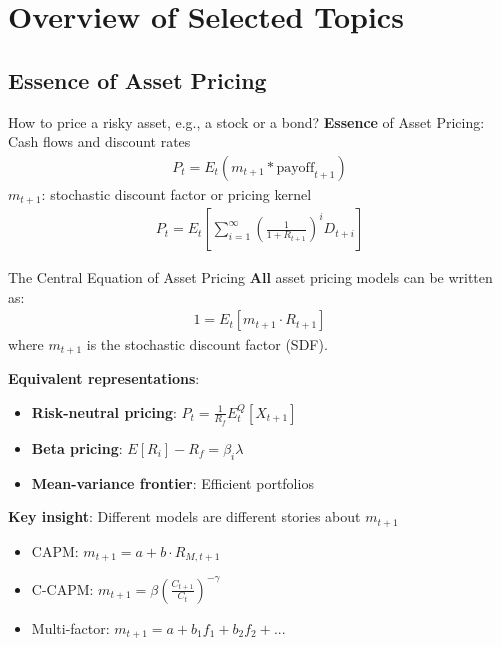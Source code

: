 \documentclass{beamer}
\begin{document}
\section{Overview of Selected Topics}

\subsection{Essence of Asset Pricing}

\begin{frame}{How to price a risky asset, e.g., a stock or a bond?}
	\textbf{Essence} of Asset Pricing: Cash flows and discount rates
	\begin{align*}
		P_{t}=E_{t}\left(m_{t+1} *  \mathrm{payoff}_{t+1}\right)
	\end{align*}
$m_{t+1}$: stochastic discount factor or pricing kernel
\begin{align*}
	P_{t}=E_{t}\left[\sum_{i=1}^{\infty}\left(\frac{1}{1+R_{t+1}}\right)^{i} D_{t+i}\right]
\end{align*}
\end{frame}

\begin{frame}{The Central Equation of Asset Pricing}
	\textbf{All} asset pricing models can be written as:
	\begin{align*}
		1 = E_t[m_{t+1} \cdot R_{t+1}]
	\end{align*}
	where $m_{t+1}$ is the \alert{stochastic discount factor (SDF)}.
	
	\vspace{10pt}
	\textbf{Equivalent representations}:
	\begin{itemize}
		\item \textbf{Risk-neutral pricing}: $P_t = \frac{1}{R_f} E^Q_t[X_{t+1}]$
		\item \textbf{Beta pricing}: $E[R_i] - R_f = \beta_i \lambda$
		\item \textbf{Mean-variance frontier}: Efficient portfolios
	\end{itemize}
	
	\vspace{10pt}
	\textbf{Key insight}: Different models are different stories about $m_{t+1}$
	\begin{itemize}
		\item CAPM: $m_{t+1} = a + b \cdot R_{M,t+1}$
		\item C-CAPM: $m_{t+1} = \beta \left(\frac{C_{t+1}}{C_t}\right)^{-\gamma}$
		\item Multi-factor: $m_{t+1} = a + b_1 f_1 + b_2 f_2 + ...$
	\end{itemize}
\end{frame}
\end{document}

